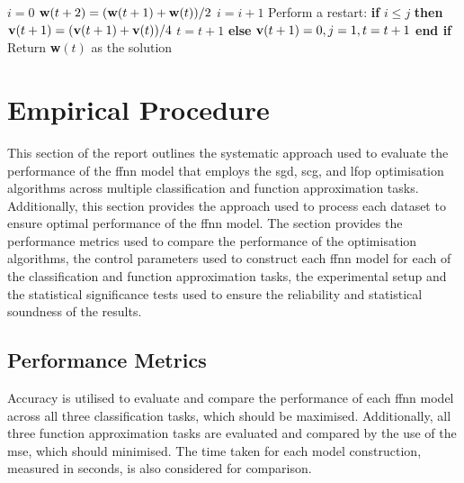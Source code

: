 \documentclass[10pt, conference]{IEEEtran}
\begin{document}
\begin{algorithm}[H]
\begin{algorithmic}[1]
                        \State $i = 0$
                    \Else
                        \State $\text{\textbf{w}}(t+2) = (\text{\textbf{w}}(t+1) + \text{\textbf{w}}(t))/2$
                        \State $i = i + 1$
                        \State Perform a restart: \textbf{if} $i \leq j$ \textbf{then}
                        \State \quad $\text{\textbf{v}}(t+1) = (\text{\textbf{v}}(t+1) + \text{\textbf{v}}(t))/4$
                        \State \quad $t = t + 1$
                        \State \textbf{else}
                        \State \quad $\text{\textbf{v}}(t+1) = 0, j = 1, t = t + 1$
                        \State \textbf{end if}
                    \EndIf
                \EndIf
        \State Return \textbf{w}$(t)$ as the solution
    \end{algorithmic}
\end{algorithm}

\section{Empirical Procedure} \label{section: Empeirical Procedure}

This section of the report outlines the systematic approach used to evaluate the performance of the \acrshort{ffnn}
model that employs the \acrshort{sgd}, \acrshort{scg}, and \acrshort{lfop} optimisation algorithms across
multiple classification and function approximation tasks. Additionally, this section provides the approach used to
process each dataset to ensure optimal performance of the \acrshort{ffnn} model. The section provides the performance
metrics used to compare the performance of the optimisation algorithms, the control parameters used to construct
each \acrshort{ffnn} model for each of the classification and function approximation tasks, the experimental setup
and the statistical significance tests used to ensure the reliability and statistical soundness of the results.

\subsection{Performance Metrics}

Accuracy is utilised to evaluate and compare the performance of each \acrshort{ffnn} model across all three
classification tasks, which should be maximised. Additionally, all three function approximation tasks are evaluated and compared
by the use of the \acrshort{mse}, which should minimised. The time taken for each model construction, measured in seconds,
is also considered for comparison.
\end{document}

